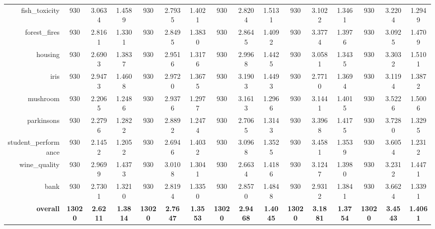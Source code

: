 \begin{table}[htbp]
{\begin{tabular}{rccccccccccccccc}
    fish\_toxicity & 930   & 3.0634 & 1.4589 & 930   & \cellcolor[rgb]{ .776,  .937,  .808}\textcolor[rgb]{ 0,  .38,  0}{2.7935} & 1.4021 & 930   & 2.8204 & 1.5131 & 930   & 3.1022 & 1.3461 & 930   & 3.2204 & 1.2949 \\
    forest\_fires & 930   & \cellcolor[rgb]{ .776,  .937,  .808}\textcolor[rgb]{ 0,  .38,  0}{2.8161} & 1.3301 & 930   & 2.8495 & 1.3830 & 930   & 2.8645 & 1.4092 & 930   & 3.3774 & 1.3976 & 930   & 3.0925 & 1.4709 \\
    housing & 930   & \cellcolor[rgb]{ .776,  .937,  .808}\textcolor[rgb]{ 0,  .38,  0}{2.6903} & 1.3837 & 930   & 2.9516 & 1.3176 & 930   & 2.9968 & 1.4425 & 930   & 3.0581 & 1.3435 & 930   & 3.3032 & 1.5101 \\
    iris  & 930   & 2.9473 & 1.4608 & 930   & 2.9720 & 1.3675 & 930   & 3.1903 & 1.4493 & 930   & \cellcolor[rgb]{ .776,  .937,  .808}\textcolor[rgb]{ 0,  .38,  0}{2.7710} & 1.3694 & 930   & 3.1194 & 1.3872 \\
    mushroom & 930   & \cellcolor[rgb]{ .776,  .937,  .808}\textcolor[rgb]{ 0,  .38,  0}{2.2065} & 1.2486 & 930   & 2.9376 & 1.2977 & 930   & 3.1613 & 1.2966 & 930   & 3.1441 & 1.4015 & 930   & 3.5226 & 1.5006 \\
    parkinsons & 930   & \cellcolor[rgb]{ .776,  .937,  .808}\textcolor[rgb]{ 0,  .38,  0}{2.2796} & 1.2822 & 930   & 2.8892 & 1.2474 & 930   & 2.7065 & 1.3143 & 930   & 3.3968 & 1.4175 & 930   & 3.7280 & 1.3295 \\
    student\_performance & 930   & \cellcolor[rgb]{ .776,  .937,  .808}\textcolor[rgb]{ 0,  .38,  0}{2.1452} & 1.2052 & 930   & 2.6946 & 1.4032 & 930   & 3.0968 & 1.3525 & 930   & 3.4581 & 1.3539 & 930   & 3.6054 & 1.2312 \\
    wine\_quality & 930   & 2.9699 & 1.4373 & 930   & 3.0108 & 1.3041 & 930   & \cellcolor[rgb]{ .776,  .937,  .808}\textcolor[rgb]{ 0,  .38,  0}{2.6634} & 1.4186 & 930   & 3.1247 & 1.3980 & 930   & 3.2312 & 1.4471 \\
    bank  & 930   & 2.7301 & 1.3210 & 930   & 2.8194 & 1.3350 & 930   & 2.8570 & 1.4848 & 930   & 2.9312 & 1.3841 & 930   & 3.6624 & 1.3391 \\
    \midrule
    \textbf{overall} & \textbf{13020} & \cellcolor[rgb]{ .776,  .937,  .808}\textcolor[rgb]{ 0,  .38,  0}{\textbf{2.6211}} & \textbf{1.3814} & \textbf{13020} & \textbf{2.7647} & \textbf{1.3553} & \textbf{13020} & \textbf{2.9468} & \textbf{1.4045} & \textbf{13020} & \textbf{3.1881} & \textbf{1.3754} & \textbf{13020} & \textbf{3.4543} & \textbf{1.4061} \\
    \end{tabular}%
    }
\end{table}%


